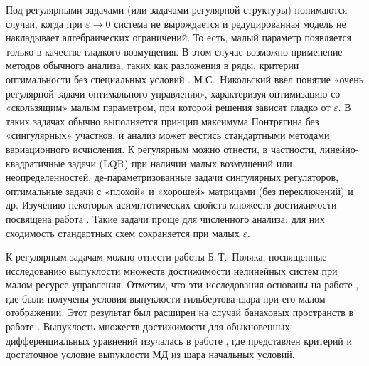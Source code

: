 \documentclass[../main.tex]{subfiles}
\begin{document}
Под регулярными задачами (или задачами регулярной структуры) понимаются случаи, когда при $\varepsilon\to0$ система не вырождается и редуцированная модель не накладывает алгебраических ограничений. 
То есть, малый параметр появляется только в качестве гладкого возмущения. 
В этом случае возможно применение методов обычного анализа, таких как разложения в ряды, критерии оптимальности без специальных условий \cite{Haratishvili}. 
М.С. Никольский \cite{Nikolski} ввел понятие «очень регулярной задачи оптимального управления», характеризуя оптимизацию со «скользящим» малым параметром, при которой решения зависят гладко от $\varepsilon$. 
В таких задачах обычно выполняется принцип максимума Понтрягина без «сингулярных» участков, и анализ может вестись стандартными методами вариационного исчисления. 
К регулярным можно отнести, в частности, линейно-квадратичные задачи (LQR) при наличии малых возмущений или неопределенностей, де-параметризованные задачи сингулярных регуляторов, оптимальные задачи с «плохой» и «хорошей» матрицами (без переключений) и др. 
Изучению некоторых асимптотических свойств множеств достижимости посвящена работа \cite{Chentsov}.
Такие задачи проще для численного анализа: для них сходимость стандартных схем сохраняется при малых $\varepsilon$.

К регулярным задачам можно отнести работы Б.\,Т.~Поляка, посвященные исследованию выпуклости множеств достижимости нелинейных систем при малом ресурсе управления.
Отметим, что эти исследования основаны на работе \cite{Polyak2001}, где были получены условия выпуклости гильбертова шара при его малом отображении. 
Этот результат был расширен на случай банаховых пространств в работе \cite{Ledyaev}.
Выпуклость множеств достижимости для обыкновенных дифференциальных уравнений изучалась в работе \cite{Reißig}, где представлен критерий и достаточное условие выпуклости МД из шара начальных условий.
\end{document}
